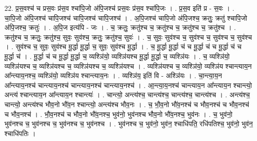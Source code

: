 \documentclass[17pt]{extarticle}
\begin{document}
22. प्र॒स॒वश्च॑ च प्रस॒वः प्र॑स॒व श्चा॑पि॒जो अ॑पि॒जश्च॑ प्रस॒वः प्र॑स॒व श्चा॑पि॒जः । . प्र॒स॒व इति॑ प्र - स॒वः । . चा॒पि॒जो अ॑पि॒जश्च॑ चापि॒जश्च॑ चापि॒जश्च॑ चापि॒जश्च॑ । . अ॒पि॒जश्च॑ चापि॒जो अ॑पि॒जश्च॒ क्रतुः॒ क्रतु॑ श्चापि॒जो अ॑पि॒जश्च॒ क्रतुः॑ । . अ॒पि॒ज इत्य॑पि - जः । . च॒ क्रतुः॒ क्रतु॑श्च च॒ क्रतु॑श्च च॒ क्रतु॑श्च च॒ क्रतु॑श्च । . क्रतु॑श्च च॒ क्रतुः॒ क्रतु॑श्च॒ सुवः॒ सुव॑श्च॒ क्रतुः॒ क्रतु॑श्च॒ सुवः॑ । . च॒ सुवः॒ सुव॑श्च च॒ सुव॑श्च च॒ सुव॑श्च च॒ सुव॑श्च । . सुव॑श्च च॒ सुवः॒ सुव॑श्च मू॒र्द्धा मू॒र्द्धा च॒ सुवः॒ सुव॑श्च मू॒र्द्धा । . च॒ मू॒र्द्धा मू॒र्द्धा च॑ च मू॒र्द्धा च॑ च मू॒र्द्धा च॑ च मू॒र्द्धा च॑ । . मू॒र्द्धा च॑ च मू॒र्द्धा मू॒र्द्धा च॒ व्यश्ञि॑यो॒ व्यश्ञि॑यश्च मू॒र्द्धा मू॒र्द्धा च॒ व्यश्ञि॑यः । . च॒ व्यश्ञि॑यो॒ व्यश्ञि॑यश्च च॒ व्यश्ञि॑यश्च च॒ व्यश्ञि॑यश्च च॒ व्यश्ञि॑यश्च । . व्यश्ञि॑यश्च च॒ व्यश्ञि॑यो॒ व्यश्ञि॑य श्चान्त्याय॒न आ᳚न्त्याय॒नश्च॒ व्यश्ञि॑यो॒ व्यश्ञि॑य श्चान्त्याय॒नः । . व्यश्ञि॑य॒ इति॑ वि - अश्ञि॑यः । . चा॒न्त्या॒य॒न आ᳚न्त्याय॒नश्च॑ चान्त्याय॒नश्च॑ चान्त्याय॒नश्च॑ चान्त्याय॒नश्च॑ । . आ॒न्त्या॒य॒नश्च॑ चान्त्याय॒न आ᳚न्त्याय॒न श्चान्त्यो॒ अन्त्य॑ श्चान्त्याय॒न आ᳚न्त्याय॒न श्चान्त्यः॑ । . चान्त्यो॒ अन्त्य॑श्च॒ चान्त्य॑श्च॒ चान्त्य॑श्च॒ चान्त्य॑श्च । . अन्त्य॑श्च॒ चान्त्यो॒ अन्त्य॑श्च भौव॒नो भौ॑व॒न श्चान्त्यो॒ अन्त्य॑श्च भौव॒नः । . च॒ भौ॒व॒नो भौ॑व॒नश्च॑ च भौव॒नश्च॑ च भौव॒नश्च॑ च भौव॒नश्च॑ । . भौ॒व॒नश्च॑ च भौव॒नो भौ॑व॒नश्च॒ भुव॑नो॒ भुव॑नश्च भौव॒नो भौ॑व॒नश्च॒ भुव॑नः । . च॒ भुव॑नो॒ भुव॑नश्च च॒ भुव॑नश्च च॒ भुव॑नश्च च॒ भुव॑नश्च । . भुव॑नश्च च॒ भुव॑नो॒ भुव॑न॒ श्चाधि॑पति॒ रधि॑पतिश्च॒ भुव॑नो॒ भुव॑न॒ श्चाधि॑पतिः । \newline
\end{document}
